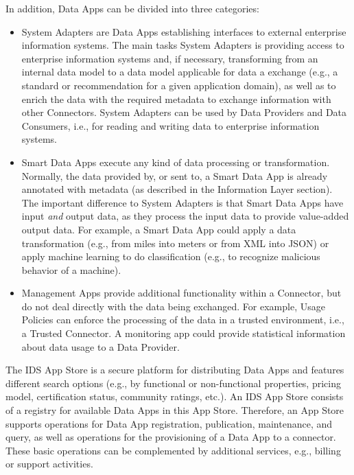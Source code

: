 In addition, Data Apps can be divided into three categories:

\begin{itemize}
	\item System Adapters are Data Apps establishing interfaces to external enterprise information systems. The main tasks System Adapters is providing access to enterprise information systems and, if necessary, transforming from an internal data model to a data model applicable for data a exchange (e.g., a standard or recommendation for a given application domain), as well as to enrich the data with the required
	metadata to exchange information with other Connectors. System Adapters can be used by Data Providers and Data Consumers, i.e., for reading and writing data to enterprise information systems. 

	\item Smart Data Apps execute any kind of data processing or transformation. Normally, the data provided by, or sent to, a Smart Data App is already annotated with metadata (as described in the Information Layer section). The important difference to System Adapters is that Smart Data Apps have input \emph{and} output data, as they process the input data to provide value-added
	output data. For example, a Smart Data App could apply a data transformation (e.g., from miles into meters or from XML into JSON) or apply machine learning to do classification (e.g., to recognize malicious
	behavior of a machine).

	\item Management Apps provide additional functionality within a Connector, but do not deal directly with the data being exchanged. For example, Usage Policies can enforce the processing of the data in a trusted environment, i.e., a Trusted Connector. A monitoring app could provide statistical information about data usage to a Data Provider.
\end{itemize}



The IDS App Store is a secure platform for distributing Data Apps and features different search options (e.g., by functional or non-functional properties, pricing model, certification status, community ratings, etc.). An IDS App Store consists of a registry for available Data Apps in this App Store. Therefore, an App Store supports operations for Data App registration, publication, maintenance, and query, as well as operations for the provisioning of a Data App to a connector. These basic operations can be complemented by additional services, e.g., billing or support activities. 


